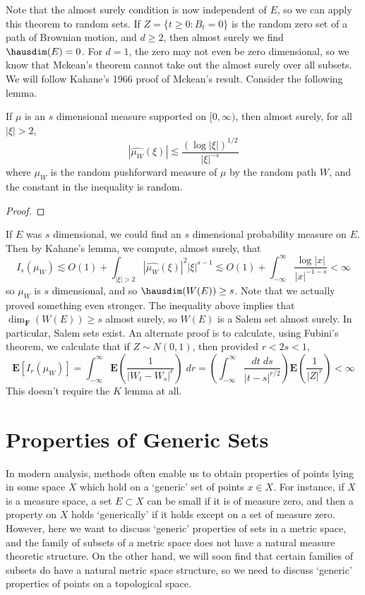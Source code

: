 Note that the almost surely condition is now independent of $E$, so we can apply this theorem to random sets. If $Z = \{ t \geq 0: B_t = 0 \}$ is the random zero set of a path of Brownian motion, and $d \geq 2$, then almost surely we find $\hausdim(E) = 0$. For $d = 1$, the zero may not even be zero dimensional, so we know that Mckean's theorem cannot take out the almost surely over all subsets. We will follow Kahane's 1966 proof of Mckean's result. Consider the following lemma.

\begin{lemma}
	If $\mu$ is an $s$ dimensional measure supported on $[0,\infty)$, then almost surely, for all $|\xi| > 2$,
	\[ |\widehat{\mu_W}(\xi)| \lesssim \frac{(\log |\xi|)^{1/2}}{|\xi|^{-s}} \]
	where $\mu_W$ is the random pushforward measure of $\mu$ by the random path $W$, and the constant in the inequality is random.
\end{lemma}
\begin{proof}
	
\end{proof}

If $E$ was $s$ dimensional, we could find an $s$ dimensional probability measure on $E$. Then by Kahane's lemma, we compute, almost surely, that
%
\[ I_s(\mu_W) \lesssim O(1) + \int_{|\xi| > 2} |\widehat{\mu_W}(\xi)|^2 |\xi|^{s-1} \lesssim O(1) + \int_{-\infty}^\infty \frac{\log |x|}{|x|^{-1-s}} < \infty \]
%
so $\mu_W$ is $s$ dimensional, and so $\hausdim(W(E)) \geq s$. Note that we actually proved something even stronger. The inequality above implies that $\dim_{\mathbf{F}}(W(E)) \geq s$ almost surely, so $W(E)$ is a Salem set almost surely. In particular, Salem sets exist. An alternate proof is to calculate, using Fubini's theorem, we calculate that if $Z \sim N(0,1)$, then provided $r < 2s < 1$,
	\[ \mathbf{E}[I_r(\mu_W)] = \int_{-\infty}^\infty \mathbf{E} \left( \frac{1}{|W_t - W_s|^r} \right)\; dr = \left( \int_{-\infty}^\infty \frac{dt\; ds}{|t-s|^{r/2}} \right) \mathbf{E} \left( \frac{1}{|Z|^r} \right) < \infty \]
	This doesn't require the $K$ lemma at all.









\chapter{Properties of Generic Sets}

In modern analysis, methods often enable us to obtain properties of points lying in some space $X$ which hold on a `generic' set of points $x \in X$. For instance, if $X$ is a measure space, a set $E \subset X$ can be small if it is of measure zero, and then a property on $X$ holds `generically' if it holds except on a set of measure zero. However, here we want to discuss `generic' properties of sets in a metric space, and the family of subsets of a metric space does not have a natural measure theoretic structure. On the other hand, we will soon find that certain families of subsets do have a natural metric space structure, so we need to discuss `generic' properties of points on a topological space.


